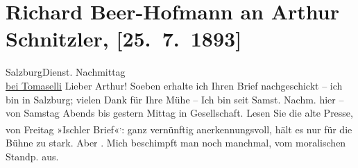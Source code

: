 

         
         \renewcommand{\erwaehntePersonen}{Personen: Julius Bauer, Bertha Flegmann, Carl Freund, Paul Horn, Josef Jarno, Felix Salten, Hermine von Schaffgotsch,  Waldner,  Waldner, Grethe Wreden}
         \renewcommand{\erwaehnteInstitutionen}{Institutionen: Freund {\kaufmannsund}  Jeckel}
         \renewcommand{\erwaehnteOrte}{Orte: Bad Ischl, Berlin, Café Tomaselli, Dauphiné, Salzburg, Wien}
         \renewcommand{\erwaehnteWerke}{Werke: Aus Ischl, Die Presse}
               \section[Richard Beer-Hofmann an Arthur Schnitzler, {[}25. 7. 1893{]}]{ Richard Beer-Hofmann an Arthur Schnitzler, {[}25. 7. 1893{]}}\nopagebreak{}\rehead{ }\begin{ledgroupsized}[t]{13cm}\normalsize\beginnumbering \toendnotes[C]{\smallbreak\pagebreak[2]} 
\toendnotes[C]{\smallbreak}\pstart
           \raggedleft{}{\pb}SalzburgDienst.{ }Nachmittag{\\}\uline{bei Tomaselli}\pend
           \pstart
           Lieber Arthur! Soeben erhalte ich Ihren Brief nachgeschickt – ich
               bin in Salzburg; vielen Dank für Ihre Mühe – Ich
               bin seit Samst.{ }Nachm. hier – von Samstag{ }Abends bis gestern{ }Mittag in Gesellschaft. Lesen Sie die alte Presse, von Freitag »Ischler Brief«\substVorne{}\textsuperscript{,}\substDazwischen{}:\substHinten{} ganz vernünftig {\pb}anerkennungsvoll, hält es nur für die Bühne zu stark. Aber . Mich beschimpft man noch manchmal, vom moralischen
               Standp. aus.\pend
           \pstart

\end{ledgroupsized}
